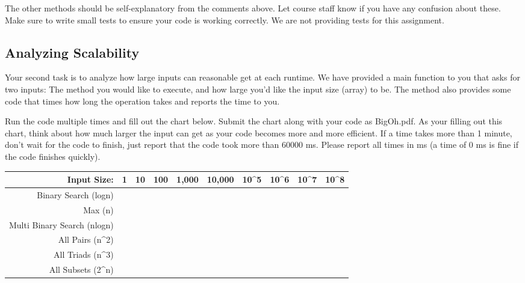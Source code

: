 \documentclass[paper=a4, fontsize=11pt, parskip=full]{scrartcl} %
\numberwithin{equation}{section} %
\numberwithin{figure}{section} %
\numberwithin{table}{section} %
\begin{document}
The other methods should be self-explanatory from the comments above. Let course staff know if you have any confusion about these. Make sure to write small tests to ensure your code is working correctly. We are not providing tests for this assignment.


\subsection{Analyzing Scalability}

Your second task is to analyze how large inputs can reasonable get at each runtime. We have provided a main function to you that asks for two inputs: The method you would like to execute, and how large you'd like the input size (array) to be. The method also provides some code that times how long the operation takes and reports the time to you.

Run the code multiple times and fill out the chart below. Submit the chart along with your code as BigOh.pdf. As your filling out this chart, think about how much larger the input can get as your code becomes more and more efficient. If a time takes more than 1 minute, don't wait for the code to finish, just report that the code took more than 60000 ms. Please report all times in ms (a time of 0 ms is fine if the code finishes quickly). 

\renewcommand{\arraystretch}{2.0}
\begin{tabular}{|r|l|l|l|l|l|l|l|l|l|}
\hline
Input Size:                        & 1 & 10 & 100 & 1,000 & 10,000 & 10\textasciicircum{}5 & 10\textasciicircum{}6 & 10\textasciicircum{}7 & 10\textasciicircum{}8 \\ \hline
Binary Search (logn)               &   &    &     &       &        &                       &                       &                       &                       \\ \hline
Max (n)                            &   &    &     &       &        &                       &                       &                       &                       \\ \hline
Multi Binary Search (nlogn)        &   &    &     &       &        &                       &                       &                       &                       \\ \hline
All Pairs (n\textasciicircum{}2)   &   &    &     &       &        &                       &                       &                       &                       \\ \hline
All Triads (n\textasciicircum{}3)  &   &    &     &       &        &                       &                       &                       &                       \\ \hline
All Subsets (2\textasciicircum{}n) &   &    &     &       &        &                       &                       &                       &                       \\ \hline
\end{tabular}


\end{document}
